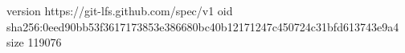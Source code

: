 version https://git-lfs.github.com/spec/v1
oid sha256:0eed90bb53f3617173853e386680bc40b12171247c450724c31bfd613743e9a4
size 119076
